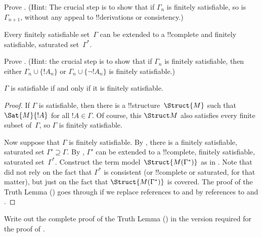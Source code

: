 \documentclass[../../../include/open-logic-section]{subfiles}
\begin{document}
\begin{prob}
Prove . (Hint: The crucial step
is to show that if $\Gamma_n$ is finitely satisfiable, so is
$\Gamma_{n+1}$, without any appeal to !!{derivation}s or consistency.)
\end{prob}

\begin{lem}
 Every finitely satisfiable set~$\Gamma$
can be extended to a !!{complete} and finitely satisfiable, saturated
set~$\Gamma^*$.
\end{lem}

\begin{prob}
Prove .  (Hint: the crucial
step is to show that if $\Gamma_n$ is finitely satisfiable, then
either $\Gamma_n \cup \{!A_n\}$ or $\Gamma_n \cup \{\lnot !A_n\}$ is
finitely satisfiable.)
\end{prob}

\begin{thm}
 $\Gamma$ is satisfiable if and only
if it is finitely satisfiable.
\end{thm}

\begin{proof}
If $\Gamma$ is satisfiable, then there is a
!!{structure}~$\Struct{M}$ such that $\Sat{M}{!A}$ for all $!A \in
\Gamma$.  Of course, this $\Struct M$ also satisfies every finite
subset of~$\Gamma$, so $\Gamma$ is finitely satisfiable.

Now suppose that $\Gamma$ is finitely satisfiable. By
, there is a finitely satisfiable, saturated
set $\Gamma' \supseteq \Gamma$. By ,
$\Gamma'$ can be extended to a !!{complete}, finitely satisfiable,
saturated set~$\Gamma^*$. Construct the term
model~$\Struct{M(\Gamma^*)}$ as in .  Note
that  did not rely on the fact that
$\Gamma^*$ is consistent (or !!{complete} or saturated, for that
matter), but just on the fact that $\Struct{M(\Gamma^*)}$ is covered.
The proof of the Truth Lemma () goes through if
we replace references to  and
 by references to
 and .
\end{proof}

\begin{prob}
Write out the complete proof of the Truth Lemma
() in the version required for the
proof of .
\end{prob}
\end{document}
